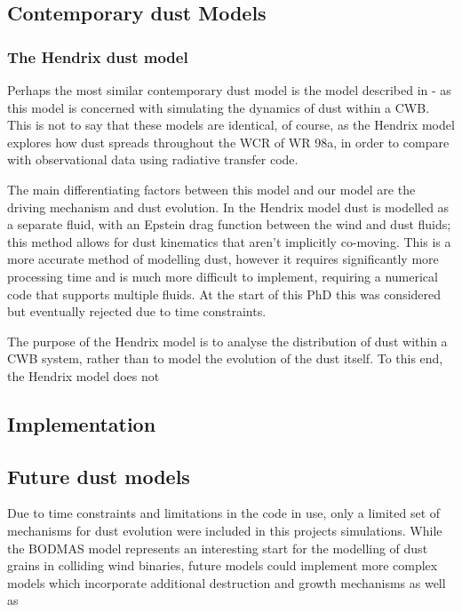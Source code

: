 \subsection{Contemporary dust Models}



\subsubsection{The Hendrix dust model}

Perhaps the most similar contemporary dust model is the model described in \cite{hendrix_pinwheels_2016} - as this model is concerned with simulating the dynamics of dust within a CWB.
This is not to say that these models are identical, of course, as the Hendrix model explores how dust spreads throughout the WCR of WR 98a, in order to compare with observational data using radiative transfer code.


The main differentiating factors between this model and our model are the driving mechanism and dust evolution.
In the Hendrix model dust is modelled as a separate fluid, with an Epstein drag function between the wind and dust fluids; this method allows for dust kinematics that aren't implicitly co-moving.
This is a more accurate method of modelling dust, however it requires significantly more processing time and is much more difficult to implement, requiring a numerical code that supports multiple fluids.
At the start of this PhD this was considered but eventually rejected due to time constraints.

The purpose of the Hendrix model is to analyse the distribution of dust within a CWB system, rather than to model the evolution of the dust itself.
To this end, the Hendrix model does not 

\subsection{Implementation}

\subsection{Future dust models}


Due to time constraints and limitations in the code in use, only a limited set of mechanisms for dust evolution were included in this projects simulations.
While the BODMAS model represents an interesting start for the modelling of dust grains in colliding wind binaries, future models could implement more complex models which incorporate additional destruction and growth mechanisms as well as 

